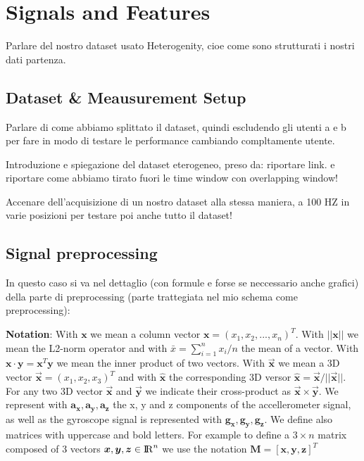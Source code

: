 \section{Signals and Features}
\label{sec:model}

Parlare del nostro dataset usato Heterogenity, cioe come sono strutturati i nostri dati partenza.



\subsection{Dataset \& Meausurement Setup}
\label{subsec:dataset-measurement-setup}
Parlare di come abbiamo splittato il dataset, quindi escludendo gli utenti a e b per fare in modo di testare le performance cambiando compltamente utente.

Introduzione e spiegazione del dataset eterogeneo, preso da: riportare link. e riportare come abbiamo tirato fuori le time window con overlapping window!

Accenare dell'acquisizione di un nostro dataset alla stessa maniera, a 100 HZ in varie posizioni per testare poi anche tutto il dataset!

\subsection{Signal preprocessing}

In questo caso si va nel dettaglio (con formule e forse se neccessario anche grafici) della parte di preprocessing (parte trattegiata nel mio schema come preprocessing):

\textbf{Notation}: With $\boldsymbol{x}$ we mean a column vector $\boldsymbol{x}=(x_{1}, x_{2}, ..., x_{n})^{T}$.  With $\boldsymbol{||x||}$ we mean the L2-norm operator and with $\bar{x} = \sum_{i=1}^{n} x_{i} / n$ the mean of a vector. With $\boldsymbol{x} \cdot \boldsymbol{y} =\boldsymbol{x}^{T}\boldsymbol{y} $ we mean the inner product of two vectors. With $\boldsymbol{\vec{x}}$ we mean a 3D vector $\boldsymbol{\vec{x}} = (x_{1}, x_{2}, x_{3})^{T}$ and with $\boldsymbol{\hat{x}}$ the corresponding 3D versor $\boldsymbol{\hat{x}}=\boldsymbol{\vec{x}}/ ||\boldsymbol{\vec{x}}||$. For any two 3D vector $\boldsymbol{\vec{x}}$ and $\boldsymbol{\vec{y}}$ we indicate their cross-product as $\boldsymbol{\vec{x}} \times \boldsymbol{\vec{y}}$. We represent with $\boldsymbol{a_{x}}, \boldsymbol{a_{y}}, \boldsymbol{a_{z}}$ the x, y and z components of the accellerometer signal, as well as the gyroscope signal is represented with $\boldsymbol{g_{x}}, \boldsymbol{g_{y}}, \boldsymbol{g_{z}}$. We define also matrices with uppercase and bold letters. For example to define a $3 \times n$ matrix composed of 3 vectors $\boldsymbol{x}, \boldsymbol{y}, \boldsymbol{z} \in {\rm I\!R}^{n}$ we use the notation $\boldsymbol{M} = [\boldsymbol{x}, \boldsymbol{y}, \boldsymbol{z}]^{T}$\\

